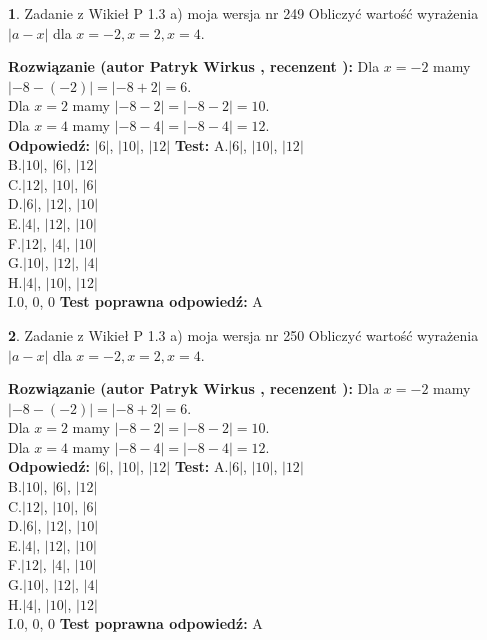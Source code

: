 \documentclass[12pt, a4paper]{article}
\theoremstyle{definition} %
\newtheorem{zad}{}
\newcommand{\zadStart}[1]{\begin{zad}#1\newline}
\newcommand{\zadStop}{\end{zad}}
\newcommand{\rozwStart}[2]{\noindent \textbf{Rozwiązanie (autor #1 , recenzent #2): }\newline}
\newcommand{\rozwStop}{\newline}
\newcommand{\odpStart}{\noindent \textbf{Odpowiedź:}\newline}
\newcommand{\odpStop}{\newline}
\newcommand{\testStart}{\noindent \textbf{Test:}\newline}
\newcommand{\testStop}{\newline}
\newcommand{\kluczStart}{\noindent \textbf{Test poprawna odpowiedź:}\newline}
\newcommand{\kluczStop}{\newline}
\begin{document}
\zadStart{Zadanie z Wikieł P 1.3 a) moja wersja nr 249}
Obliczyć wartość wyrażenia $|a - x|$ dla $x=-2,x=2,x=4$.
\zadStop
\rozwStart{Patryk Wirkus}{}
Dla $x = -2$ mamy $|-8 - (-2)| = |-8 + 2| = 6$.\\
Dla $x = 2$ mamy $|-8 - 2| = |-8 - 2| = 10$.\\
Dla $x = 4$ mamy $|-8 - 4| = |-8 - 4| = 12$.\\
\rozwStop
\odpStart
$|6|$, $|10|$, $|12|$
\odpStop
\testStart
A.$|6|$, $|10|$, $|12|$\\
B.$|10|$, $|6|$, $|12|$\\
C.$|12|$, $|10|$, $|6|$\\
D.$|6|$, $|12|$, $|10|$\\
E.$|4|$, $|12|$, $|10|$\\
F.$|12|$, $|4|$, $|10|$\\
G.$|10|$, $|12|$, $|4|$\\
H.$|4|$, $|10|$, $|12|$\\
I.$0$, $0$, $0$
\testStop
\kluczStart
A
\kluczStop



\zadStart{Zadanie z Wikieł P 1.3 a) moja wersja nr 250}
Obliczyć wartość wyrażenia $|a - x|$ dla $x=-2,x=2,x=4$.
\zadStop
\rozwStart{Patryk Wirkus}{}
Dla $x = -2$ mamy $|-8 - (-2)| = |-8 + 2| = 6$.\\
Dla $x = 2$ mamy $|-8 - 2| = |-8 - 2| = 10$.\\
Dla $x = 4$ mamy $|-8 - 4| = |-8 - 4| = 12$.\\
\rozwStop
\odpStart
$|6|$, $|10|$, $|12|$
\odpStop
\testStart
A.$|6|$, $|10|$, $|12|$\\
B.$|10|$, $|6|$, $|12|$\\
C.$|12|$, $|10|$, $|6|$\\
D.$|6|$, $|12|$, $|10|$\\
E.$|4|$, $|12|$, $|10|$\\
F.$|12|$, $|4|$, $|10|$\\
G.$|10|$, $|12|$, $|4|$\\
H.$|4|$, $|10|$, $|12|$\\
I.$0$, $0$, $0$
\testStop
\kluczStart
A
\kluczStop
\end{document}
